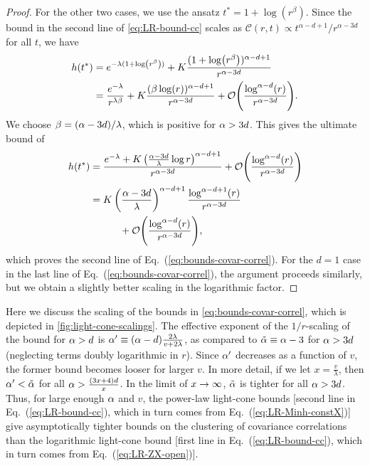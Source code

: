 \begin{proof}
For the other two cases, we use the ansatz $t^* = 1+\log(r^\beta)$.
Since the bound in the second line of \cref{eq:LR-bound-cc} scales as
$ \mathcal C(r,t) \propto t^{\alpha-d+1}/r^{\alpha-3d}$
for all $t$, we have
\begin{align}
  h(t^*) &= e^{-\lambda(1+\log(r^\beta))} + K \frac{(1+\log(r^\beta))^{\al-d+1}}{r^{\al-3d}}\nonumber \\
  &= \frac{e^{-\lambda}}{ r^{\lambda\beta}}+ K \frac{(\beta\log(r))^{\al-d+1}}{r^{\al-3d}}
  + \O{\frac{\log^{\al-d}(r)}{r^{\al-3d}}}.
\end{align}
We choose $\beta = (\alpha-3d)/\lambda$, which is positive for $\alpha>3d$.
This gives the ultimate bound of
\begin{align}
  h(t^*) &=  \frac{e^{-\lambda}+ K  \left( \frac{\alpha -3d}{\lambda} \log r \right)^{\alpha-d+1}}{r^{\alpha - 3d}} + \O{\frac{\log^{\al-d}(r)}{r^{\al-3d}}}\nonumber\\
  &=
   K\left(\frac{\al-3d}{\lambda}\right)^{\al-d+1}\frac{\log^{\al-d+1}(r)}{r^{\al-3d}} \nonumber\\&\quad \qquad + \O{\frac{\log^{\al-d}(r)}{r^{\al-3d}}},
\end{align}
which proves the second line of Eq.~(\ref{eq:bounds-covar-correl}). For the $d=1$ case in the last line of Eq.~(\ref{eq:bounds-covar-correl}), the argument proceeds similarly, but we obtain a slightly better scaling in the logarithmic factor.
\end{proof}

Here we discuss the scaling of the bounds in \cref{eq:bounds-covar-correl}, which is depicted in \cref{fig:light-cone-scalings}.
The effective exponent of the $1/r$-scaling of the bound for $\alpha > d$ is $ \alpha' \equiv (\alpha - d)\frac{2\lambda}{ v + 2\lambda}$, as compared to $\tilde {\alpha} \equiv \alpha-3$ for $\alpha > 3d$ (neglecting terms doubly logarithmic in $r$).
Since $\alpha'$ decreases as a function of $v$, the former bound becomes looser for larger $v$.
In more detail, if we let $x = \frac v\lambda$, then $\alpha' < \tilde {\alpha}$ for all $\alpha > \frac{(3x+4)d}{x}$.
In the limit of $x\rightarrow \infty$, $\tilde {\alpha}$ is tighter for all $\alpha > 3d$.
Thus, for large enough $\alpha$ and $v$, the power-law light-cone bounds [second line in Eq.~(\ref{eq:LR-bound-cc}), which in turn comes from Eq.~(\ref{eq:LR-Minh-constX})]  give asymptotically tighter bounds on the clustering of covariance correlations than the logarithmic light-cone bound [first line in Eq.~(\ref{eq:LR-bound-cc}), which in turn comes from Eq.~(\ref{eq:LR-ZX-open})].

